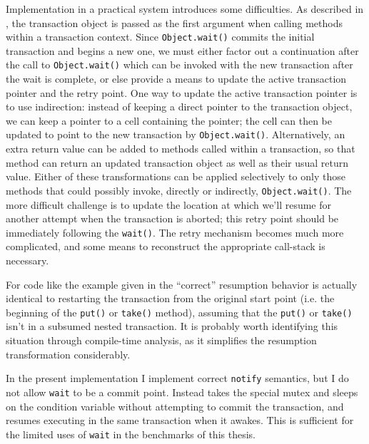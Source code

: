 Implementation in a practical system introduces some difficulties.  As
described in , the transaction object is passed as
the first argument when calling methods within a transaction context.
Since \texttt{Object.wait()} commits the initial transaction and
begins a new one, we must either factor out a continuation after the
call to \texttt{Object.wait()} which can be invoked with the new
transaction after the wait is complete, or else provide a means to
update the active transaction pointer and the retry point.  One way to
update the active transaction pointer is to use indirection: instead
of keeping a direct pointer to the transaction object, we can keep a
pointer to a cell containing the pointer; the cell can then be updated
to point to the new transaction by \texttt{Object.wait()}.
Alternatively, an extra return value can be added to methods called
within a transaction, so that method can return an updated transaction
object as well as their usual return value.  Either of these
transformations can be applied selectively to only those methods that
could possibly invoke, directly or indirectly, \texttt{Object.wait()}.
The more difficult challenge is to update the location at which we'll
resume for another attempt when the transaction is aborted; this retry
point should be immediately following the
\texttt{wait()}. The retry mechanism
becomes much more complicated, and some means to reconstruct the
appropriate call-stack is necessary.

For code like the example given in  the
``correct'' resumption behavior is actually identical to restarting
the transaction from the original start point (i.e. the beginning of
the \texttt{put()} or \texttt{take()} method), assuming that the
\texttt{put()} or \texttt{take()} isn't in a subsumed nested
transaction.  It is probably worth identifying this situation through
compile-time analysis, as it simplifies the resumption transformation
considerably.

In the present implementation I implement correct \texttt{notify} semantics,
but I do not allow \texttt{wait} to be a commit point.  Instead \flex
takes the special mutex and sleeps on the condition variable without
attempting to commit the transaction, and resumes executing in the same
transaction when it awakes.  This is sufficient for the limited uses of
\texttt{wait} in the benchmarks of this thesis.

